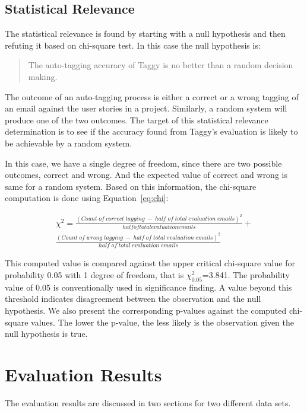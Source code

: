 \subsection{Statistical Relevance}
The statistical relevance is found by starting with a null hypothesis and then refuting it based on chi-square test. In this case the null hypothesis is:

\begin{quote}
	The auto-tagging accuracy of Taggy is no better than a random decision making.
\end{quote}

The outcome of an auto-tagging process is either a correct or a wrong tagging of an email against the user stories in a project. Similarly, a random system will produce one of the two outcomes. The target of this statistical relevance determination is to see if the accuracy found from Taggy's evaluation is likely to be achievable by a random system.

In this case, we have a single degree of freedom, since there are two possible outcomes, correct and wrong. And the expected value of correct and wrong is same for a random system. Based on this information, the chi-square computation is done using Equation~\ref{eq:chi}:



\begin{equation}
\label{eq:chi}
\begin{split}
	\chi ^ 2 = \frac {(Count \; of \; correct \; tagging \; - \; half \; of \; total \; evaluation \; emails) ^ 2} {half of total evaluation emails} +  	
\\
	\frac{(Count \; of \; wrong \; tagging \; - \; half \; of \; total \; evaluation \; emails)  ^ 2} {half \; of \; total \; evaluation \; emails}
\end{split}	
\end{equation}                                       

This computed value is compared against the upper critical chi-square value for probability 0.05 with 1 degree of freedom, that is $\chi^{2}_{0.05}$=3.841. The probability value of 0.05 is conventionally used in significance finding. A value beyond this threshold indicates disagreement between the observation and the null hypothesis. We also present the corresponding p-values against the computed chi-square values. The lower the p-value, the less likely is the observation given the null hypothesis is true.

\section{Evaluation Results}
The evaluation results are discussed in two sections for two different data sets.

